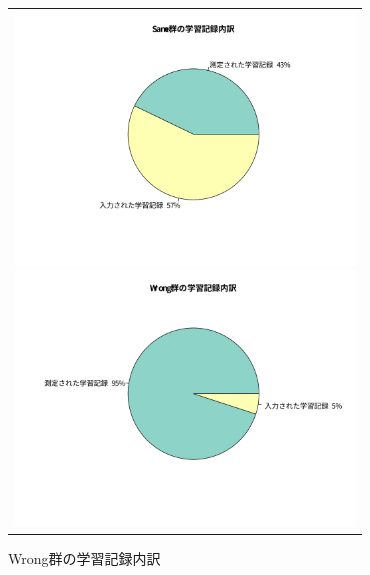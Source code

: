 \begin{figure}[htb]
\begin{center}
\begin{tabular}{c}

  \begin{minipage}[htb]{0.5\linewidth}
  \begin{center}
  \includegraphics[width=9cm]{images/7/same_records_ratio.pdf}
  \caption{Same群の学習記録内訳}
  \label{fig:same_records_ratio}
  \end{center}
  \end{minipage}

  \begin{minipage}[htb]{0.5\linewidth}
  \begin{center}
  \includegraphics[width=9cm]{images/7/wrong_records_ratio.pdf}
  \caption{Wrong群の学習記録内訳}
  \label{fig:wrong_records_ratio}
  \end{center}
  \end{minipage}

  \\


\end{tabular}
\end{center}
\end{figure}
